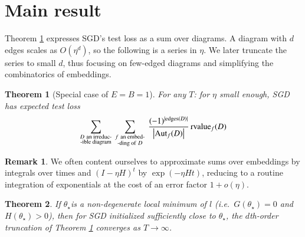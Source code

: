 \documentclass[openany, notitlepage, justified]{tufte-book}
\theoremstyle{plain}
\newtheorem{thm}{Theorem}
\theoremstyle{definition}
\newtheorem{rmk}{Remark}
\newcommand{\wabs}[1]{\left|#1\right|}
\newcommand{\Aut}{\text{\textnormal{Aut}}}
\newcommand{\rvalue}{\text{\textnormal{rvalue}}}
\newcommand{\edges}{\text{\textnormal{edges}}}
\begin{document}
    \section{Main result}

        Theorem \ref{thm:resum} expresses SGD's test loss as a sum over
        diagrams.  A diagram with $d$ edges scales as $O(\eta^d)$, so the
        following is a series in $\eta$.  We later truncate the series to small
        $d$, thus focusing on few-edged diagrams and simplifying the
        combinatorics of embeddings.
        \begin{thm}[Special case of $E=B=1$] \label{thm:resum}
            For any $T$: for $\eta$ small enough, SGD has expected test loss
            \begin{equation*} \label{eq:resum}
                \sum_{\substack{D~\text{an irreduc-} \\ \text{-ible diagram}}}
                ~
                \sum_{\substack{f~\text{an embed-} \\ \text{-ding of}~D}}
                ~
                \frac{(-1)^{|\edges(D)|}}{\wabs{\Aut_f(D)}}
                \,
                {\rvalue_f}(D)
            \end{equation*}
        \end{thm}

 
        \begin{rmk} \label{rmk:integrate}
            We often content ourselves to approximate sums over embeddings by
            integrals over times and $(I-\eta H)^t$ by $\exp(- \eta H t)$,
            reducing to a routine integration of exponentials at the cost of an
            error factor $1 + o(\eta)$.
        \end{rmk}

 
        \begin{thm} \label{thm:converge}
            If $\theta_\star$is a non-degenerate local minimum of $l$ (i.e.\
            $G(\theta_\star)=0$ and $H(\theta_\star) > 0$), then for SGD
            initialized sufficiently close to $\theta_\star$, the $d$th-order
            truncation of Theorem \ref{thm:resum} converges as $T\to \infty$.
        \end{thm}
\end{document}
